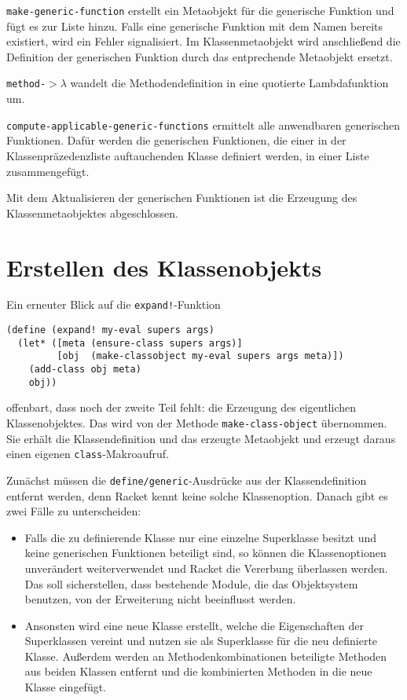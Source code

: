 \texttt{make-generic-function} erstellt ein Metaobjekt für die generische Funktion und fügt es zur Liste hinzu. Falls eine generische Funktion mit dem Namen bereits existiert, wird ein Fehler signalisiert. Im Klassenmetaobjekt wird anschließend die Definition der generischen Funktion durch das entprechende Metaobjekt ersetzt.

\texttt{method-$>\lambda$} wandelt die Methodendefinition in eine quotierte Lambdafunktion um.

\texttt{compute-applicable-generic-functions} ermittelt alle anwendbaren generischen Funktionen. Dafür werden die generischen Funktionen, die einer in der Klassenpräzedenzliste auftauchenden Klasse definiert werden, in einer Liste zusammengefügt.

Mit dem Aktualisieren der generischen Funktionen ist die Erzeugung des Klassenmetaobjektes abgeschlossen.

\section{Erstellen des Klassenobjekts}

Ein erneuter Blick auf die \texttt{expand!}-Funktion

\begin{lstlisting}
(define (expand! my-eval supers args)
  (let* ([meta (ensure-class supers args)]
         [obj  (make-classobject my-eval supers args meta)])
    (add-class obj meta)
    obj))
\end{lstlisting}

offenbart, dass noch der zweite Teil fehlt: die Erzeugung des eigentlichen Klassenobjektes. Das wird von der Methode \texttt{make-class-object} übernommen. Sie erhält die Klassendefinition und das erzeugte Metaobjekt und erzeugt daraus einen eigenen \texttt{class}-Makroaufruf.

Zunächst müssen die \texttt{define/generic}-Ausdrücke aus der Klassendefinition entfernt werden, denn Racket kennt keine solche Klassenoption. Danach gibt es zwei Fälle zu unterscheiden:
\begin{itemize}
 \item Falls die zu definierende Klasse nur eine einzelne Superklasse besitzt und keine generischen Funktionen beteiligt sind, so können die Klassenoptionen unverändert weiterverwendet und Racket die Vererbung überlassen werden. Das soll sicherstellen, dass bestehende Module, die das Objektsystem benutzen, von der Erweiterung nicht beeinflusst werden.
 \item Ansonsten wird eine neue Klasse erstellt, welche die Eigenschaften der Superklassen vereint und nutzen sie als Superklasse für die neu definierte Klasse. Außerdem werden an  Methodenkombinationen beteiligte Methoden aus beiden Klassen entfernt und die kombinierten Methoden in die neue Klasse eingefügt.
\end{itemize}

